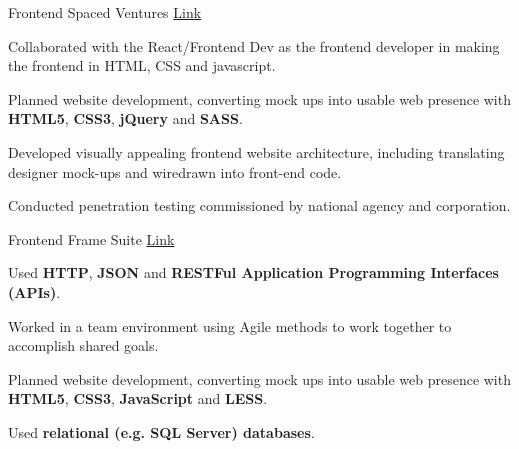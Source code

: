 

\begin{cventries}

  \cventry
    {Frontend} %
    {Spaced Ventures} %
    {{\href{https://www.spacedventures.com/}{Link}}} %
    {} %
    {
      \begin{cvitems} %
        \item {Collaborated with the React/Frontend Dev as the frontend developer in making the frontend in HTML, CSS and javascript.}
        \item {Planned website development, converting mock ups into usable web presence with \textbf{HTML5}, \textbf{CSS3}, \textbf{jQuery} and \textbf{SASS}.}
        \item {Developed visually appealing frontend website architecture, including translating designer mock-ups and wiredrawn into front-end code.}
        \item {Conducted penetration testing commissioned by national agency and corporation.}
      \end{cvitems}
    }

  \cventry
    {Frontend} %
    {Frame Suite} %
    {{\href{https://store.framesuite.com/}{Link}}} %
    {} %
    {
      \begin{cvitems} %
        \item {Used \textbf{HTTP}, \textbf{JSON} and \textbf{RESTFul Application Programming Interfaces (APIs)}.}
        \item {Worked in a team environment using Agile methods to work together to accomplish shared goals.}
        \item {Planned website development, converting mock ups into usable web presence with \textbf{HTML5}, \textbf{CSS3}, \textbf{JavaScript} and \textbf{LESS}.}
        \item {Used \textbf{relational (e.g. SQL Server) databases}.}

      \end{cvitems}
    }

\end{cventries}
